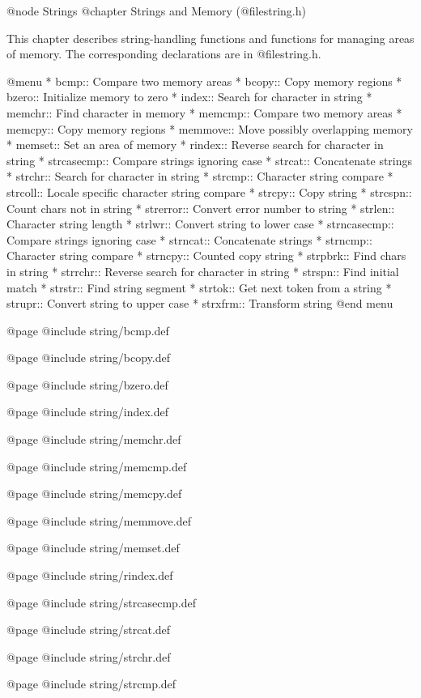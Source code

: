 @node Strings
@chapter Strings and Memory (@file{string.h})

This chapter describes string-handling functions and functions for
managing areas of memory.  The corresponding declarations are in
@file{string.h}.

@menu
* bcmp::        Compare two memory areas
* bcopy::       Copy memory regions
* bzero::       Initialize memory to zero
* index::       Search for character in string
* memchr::      Find character in memory
* memcmp::      Compare two memory areas
* memcpy::      Copy memory regions
* memmove::     Move possibly overlapping memory
* memset::      Set an area of memory
* rindex::      Reverse search for character in string
* strcasecmp::	Compare strings ignoring case
* strcat::      Concatenate strings
* strchr::      Search for character in string
* strcmp::      Character string compare
* strcoll::     Locale specific character string compare
* strcpy::      Copy string
* strcspn::     Count chars not in string
* strerror::    Convert error number to string
* strlen::      Character string length
* strlwr::	Convert string to lower case
* strncasecmp::	Compare strings ignoring case
* strncat::     Concatenate strings
* strncmp::     Character string compare
* strncpy::     Counted copy string
* strpbrk::     Find chars in string
* strrchr::     Reverse search for character in string
* strspn::      Find initial match
* strstr::      Find string segment
* strtok::      Get next token from a string
* strupr::	Convert string to upper case
* strxfrm::     Transform string
@end menu

@page
@include string/bcmp.def

@page
@include string/bcopy.def

@page
@include string/bzero.def

@page
@include string/index.def

@page
@include string/memchr.def

@page
@include string/memcmp.def

@page
@include string/memcpy.def

@page
@include string/memmove.def

@page
@include string/memset.def

@page
@include string/rindex.def

@page
@include string/strcasecmp.def

@page
@include string/strcat.def

@page
@include string/strchr.def

@page
@include string/strcmp.def

